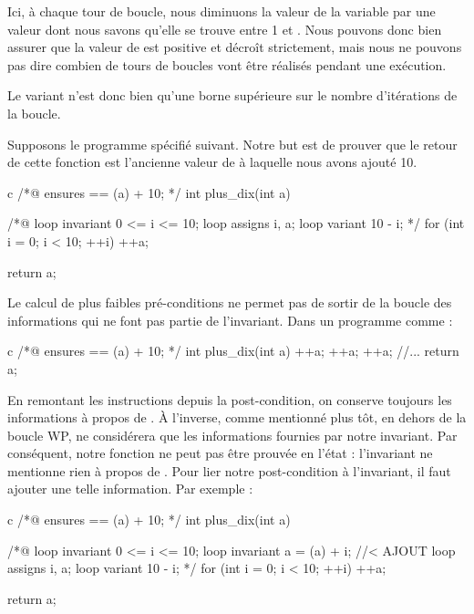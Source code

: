 \documentclass[middle]{zmdocument}
\begin{document}
Ici, à chaque tour de boucle, nous diminuons la valeur de la variable  par une
valeur dont nous savons qu'elle se trouve entre 1 et . Nous pouvons donc bien 
assurer que la valeur de  est positive et décroît strictement, mais nous ne 
pouvons pas dire combien de tours de boucles vont être réalisés pendant une 
exécution.



Le variant n'est donc bien qu'une borne supérieure sur le nombre d'itérations 
de la boucle.





Supposons le programme spécifié suivant. Notre but est de prouver que le retour
de cette fonction est l'ancienne valeur de  à laquelle nous avons ajouté 10.



\begin{CodeBlock}{c}
/*@
    ensures \result == \old(a) + 10;
*/
int plus_dix(int a){
    /*@
        loop invariant 0 <= i <= 10;
        loop assigns i, a;
        loop variant 10 - i;
    */
    for (int i = 0; i < 10; ++i)
        ++a;

    return a;
}
\end{CodeBlock}



Le calcul de plus faibles pré-conditions ne permet pas de sortir de la boucle des
informations qui ne font pas partie de l'invariant. Dans un programme comme :



\begin{CodeBlock}{c}
/*@
    ensures \result == \old(a) + 10;
*/
int plus_dix(int a){
    ++a;
    ++a;
    ++a;
    //...
    return a;
}
\end{CodeBlock}



En remontant les instructions depuis la post-condition, on conserve toujours les
informations à propos de . À l'inverse, comme mentionné plus tôt, en dehors
de la boucle WP, ne considérera que les informations fournies par notre
invariant. Par conséquent, notre fonction  ne peut pas être prouvée
en l'état : l'invariant ne mentionne rien à propos de . Pour lier notre
post-condition à l'invariant, il faut ajouter une telle information. Par 
exemple :



\begin{CodeBlock}{c}
/*@
    ensures \result == \old(a) + 10;
*/
int plus_dix(int a){
    /*@
        loop invariant 0 <= i <= 10;
        loop invariant a = \old(a) + i; //< AJOUT
        loop assigns i, a;
        loop variant 10 - i;
    */
    for (int i = 0; i < 10; ++i)
        ++a;

    return a;
}
\end{CodeBlock}
\end{document}

